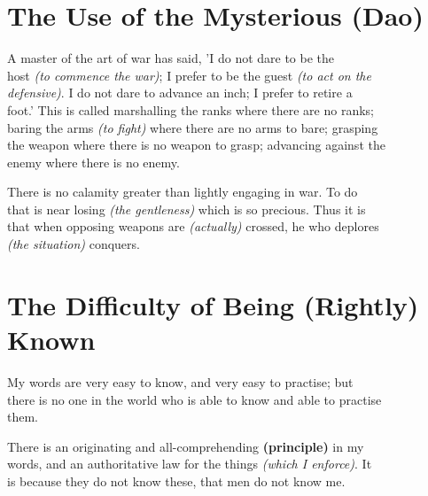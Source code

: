 \section*{The Use of the Mysterious (Dao)}
    A master of the art of war has said, 'I do not dare to be the\\
    host \textit{(to commence the war)}; I prefer to be the guest \textit{(to act on the\\
    defensive)}. I do not dare to advance an inch; I prefer to retire a\\
    foot.' This is called marshalling the ranks where there are no ranks;\\
    baring the arms \textit{(to fight)} where there are no arms to bare; grasping\\
    the weapon where there is no weapon to grasp; advancing against the\\
    enemy where there is no enemy.\vspace{\baselineskip}
    
    There is no calamity greater than lightly engaging in war. To do\\
    that is near losing \textit{(the gentleness)} which is so precious. Thus it is\\
    that when opposing weapons are \textit{(actually)} crossed, he who deplores\\
    \textit{(the situation)} conquers.\vspace{\baselineskip}
    
\section*{The Difficulty of Being (Rightly) Known}
    My words are very easy to know, and very easy to practise; but\\
    there is no one in the world who is able to know and able to practise\\
    them.\vspace{\baselineskip}\newpage{}
    
    There is an originating and all-comprehending \textbf{(principle)} in my\\
    words, and an authoritative law for the things \textit{(which I enforce)}. It\\
    is because they do not know these, that men do not know me.\vspace{\baselineskip}
    
